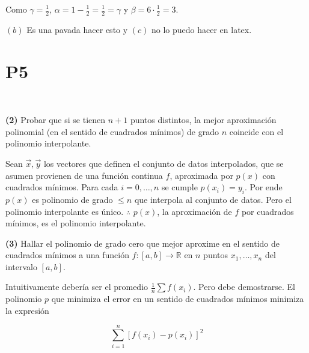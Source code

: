 \documentclass[12pt]{article}
\begin{document}
Como $\gamma = \frac{1}{2}$, $\alpha = 1 - \frac{1}{2} = \frac{1}{2} = \gamma$ y
$\beta = 6 \cdot \frac{1}{2} = 3$.

$(b)$ Es una pavada hacer esto y $(c)$ no lo puedo hacer en latex.



















\pagebreak
\section{P5}

~ 

\begin{myframe}
    \textbf{(2)} Probar que si se tienen $n + 1$ puntos distintos, la mejor
    aproximación polinomial (en el sentido de cuadrados mínimos) de grado $n$
    coincide con el polinomio interpolante.
\end{myframe}

Sean $\overrightarrow{x}, \overrightarrow{y}$ los vectores que definen el
conjunto de datos interpolados, que se asumen provienen de una función continua
$f$, aproximada por $p(x)$ con cuadrados mínimos. Para cada $i = 0,\ldots, n$ se
cumple $p(x_i) = y_i$. Por ende $p(x)$ es polinomio de grado $\leq n$ que
interpola al conjunto de datos. Pero el polinomio interpolante es único.
$\therefore $ $p(x)$, la aproximación de $f$ por cuadrados mínimos, es el
polinomio interpolante.

\pagebreak 

\begin{myframe}
    \textbf{(3)} Hallar el polinomio de grado cero que mejor aproxime en el sentido de cuadrados mínimos a una función
    $f : [a,b] \to \mathbb{R}$ en $n$ puntos $x_1,\ldots,x_n$ del intervalo $[a,b]$.
\end{myframe}

Intuitivamente debería ser el promedio $\frac{1}{n} \sum f(x_i)$. Pero debe
demostrarse. El polinomio $p$ que minimiza el error en un sentido de cuadrados
mínimos minimiza la expresión

\begin{equation*}
    \sum_{i=1}^n \left[ f(x_i) - p(x_i) \right]^2
\end{equation*}
\end{document}
